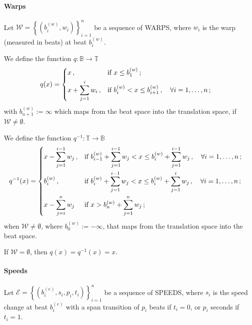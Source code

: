 \documentclass[a4paper,9pt]{article}
\begin{document}
\paragraph{Warps}
Let $ \mathcal{W} =  \left\{\left( b_i^{(w)}, w_i \right)\right\}_{i=1}^{n} $ be a sequence of WARPS, where $ w_i $ is the warp (measured in beats) at beat $ b_i^{(w)} $. 

We define the function $ q: \mathbb{B}\rightarrow \mathbb{T} $
\begin{equation}
	q(x) = \begin{dcases}
		x\,, & \text{if $ x \leq b^{(w)}_1 $}\,;\\
		x+ \sum_{j=1}^{i}w_i\,, & \text{if $ b^{(w)}_i < x \leq b^{(w)}_{i+1}\,,\quad \forall i=1,\dots,n$}\,;\\
	\end{dcases}
	\label{eq:q-1}
\end{equation}
with $ b^{(w)}_{n+1} := \infty $ which maps from the beat space into the translation space, if $ \mathcal{W} \neq \emptyset $.

We define the function $ q^{-1}: \mathbb{T}\rightarrow \mathbb{B} $
\begin{equation}
	q^{-1}(x) = \begin{dcases}
		x - \sum_{j=1}^{i-1}w_j\,, & \text{if $ b^{(w)}_{i-1} + \sum_{j=1}^{i-1}w_j < x \leq b^{(w)}_i + \sum_{j=1}^{i-1}w_j\,, \quad \forall i=1,\dots,n$}\,;\\
		b^{(w)}_i\,, & \text{if $ b^{(w)}_i + \sum_{j=1}^{i-1}w_j < x \leq b^{(w)}_i + \sum_{j=1}^i w_j\,,\quad \forall i=1,\dots,n $}\,;\\
		x - \sum_{j=i}^n w_j & \text{if $ x > b^{(w)}_n + \sum_{j=1}^n w_j $}\,; 
	\end{dcases}
	\label{eq:q}
\end{equation}
when $ \mathcal{W} \neq \emptyset $, where $ b^{(w)}_0 := -\infty $, that maps from the translation space into the beat space.

If $ \mathcal{W} = \emptyset $, then $ q(x) = q^{-1}(x) = x$. 

\paragraph{Speeds}
Let $ \mathcal{E} =  \left\{\left( b_i^{(e)}, s_i, p_i, t_i \right)\right\}_{i=1}^{n} $ be a sequence of SPEEDS, where $ s_i $ is the speed change at beat $ b_i^{(e)} $ with a span transition of $ p_i $ beats if $ t_i = 0 $, or $ p_i $ seconds if $ t_i=1 $. 
\end{document}

